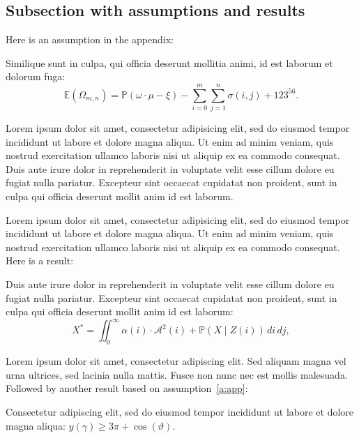 \documentclass[letterpaper,11pt,leqno]{article}
\begin{document}
\subsection{Subsection with assumptions and results}

Here is an assumption in the appendix:

\begin{assumption} Similique sunt in culpa, qui officia deserunt mollitia animi, id est laborum et dolorum fuga:
\begin{equation*}
\mathbb{E}(\Omega_{m,n}) = \mathbb{P}(\omega\cdot \mu - \xi) - \sum_{i=0}^{m}\sum_{j=1}^{n} \sigma(i,j) + 123^{56}.
\end{equation*}\label{a:app}\end{assumption}

Lorem ipsum dolor sit amet, consectetur adipisicing elit, sed do eiusmod
tempor incididunt ut labore et dolore magna aliqua. Ut enim ad minim veniam,
quis nostrud exercitation ullamco laboris nisi ut aliquip ex ea commodo
consequat. Duis aute irure dolor in reprehenderit in voluptate velit esse
cillum dolore eu fugiat nulla pariatur. Excepteur sint occaecat cupidatat non
proident, sunt in culpa qui officia deserunt mollit anim id est laborum.

Lorem ipsum dolor sit amet, consectetur adipisicing elit, sed do eiusmod
tempor incididunt ut labore et dolore magna aliqua. Ut enim ad minim veniam,
quis nostrud exercitation ullamco laboris nisi ut aliquip ex ea commodo
consequat. Here is a result:
\begin{theorem}
Duis aute irure dolor in reprehenderit in voluptate velit esse
cillum dolore eu fugiat nulla pariatur. Excepteur sint occaecat cupidatat non
proident, sunt in culpa qui officia deserunt mollit anim id est laborum:
\begin{equation}
X^* =\iint_{0}^{\infty} \alpha(i) \cdot \mathcal{A}^2(i) + \mathbb{P}(X\mid Z(i))\,di\,dj,\end{equation}\end{theorem}

Lorem ipsum dolor sit amet, consectetur adipiscing elit. Sed aliquam magna vel urna ultrices, sed lacinia nulla mattis. Fusce non nunc nec est mollis malesuada. Followed by another result based on assumption~\ref{a:app}:
\begin{theorem}
Consectetur adipiscing elit, sed do eiusmod tempor incididunt ut labore et dolore magna aliqua: $y(\gamma) \geq 3\pi + \cos(\vartheta)$.
\label{t:theorem1}\end{theorem}
\end{document}
